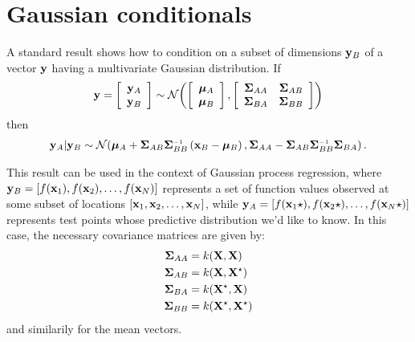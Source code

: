 
\inbpdocument

\chapter{Gaussian conditionals}
\label{ch:appendix-gaussians}


A standard result shows how to condition on a subset of dimensions ${\bf{y}}_B$ of a vector ${\bf{y}}$ having a multivariate Gaussian distribution.
If
%
\begin{align}
{\bf{y}} = \left[ \begin{array}{c} {{\bf{y}}_A} \\ {{\bf{y}}_B} \end{array} \right] \sim \mathcal{N}\!\left(\left[ \begin{array}{c} {{\boldsymbol{\mu}}_A} \\ {{\boldsymbol{\mu}}_B} \end{array} \right],\left[ \begin{array}{cc}\mathbf{\Sigma}_{AA} & \mathbf{\Sigma}_{AB} \\ \mathbf{\Sigma}_{BA} & \mathbf{\Sigma}_{BB} \end{array} \right]\right)
\end{align}
%
then
%
\begin{align}
\vy_A | \vy_B \sim \Nt{\vmu_A + \vSigma_{AB} \vSigma_{BB}\inv \left( \vx_B - \vmu_B \right) }
{\vSigma_{AA} - \vSigma_{AB} \vSigma_{BB}\inv \vSigma_{BA} }.
\label{eq:gauss_conditional}
\end{align}

This result can be used in the context of Gaussian process regression, where ${\bf{y}}_B = [f({\bf{x}}_1), f({\bf{x}}_2), \dots, f({\bf{x}}_N)]$ represents a set of function values observed at some subset of locations $[{\bf{x}}_1, {\bf{x}}_2, \dots, {\bf{x}}_N]$, while ${\bf{y}}_A = [f({\bf{x}}_1\star), f({\bf{x}}_2\star), \ldots, f({\bf{x}}_N\star)]$ represents test points whose predictive distribution we'd like to know.
In this case, the necessary covariance matrices are given by:
%
\begin{align}
\mathbf{\Sigma}_{AA} & = k(\mathbf{X}, \mathbf{X}) \\
\mathbf{\Sigma}_{AB} & = k(\mathbf{X}, \mathbf{X}^\star) \\
\mathbf{\Sigma}_{BA} & = k(\mathbf{X}^\star, \mathbf{X}) \\
\mathbf{\Sigma}_{BB} & = k(\mathbf{X}^\star, \mathbf{X}^\star)
\end{align}
and similarily for the mean vectors.






